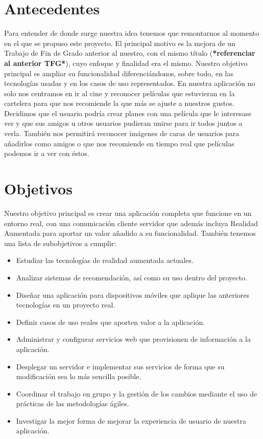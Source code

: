 \section{Antecedentes}
\label{makereference1.1}
\begin{flushleft}
    Para entender de donde surge nuestra idea tenemos que remontarnos al momento en el que se propuso este proyecto.
    El principal motivo es la mejora de un Trabajo de Fin de Grado anterior
    al nuestro, con el mismo título (\textbf{*referenciar al anterior TFG*}), cuyo enfoque y finalidad era el mismo. Nuestro objetivo principal es 
    ampliar su funcionalidad diferenciándonos, sobre todo, en las tecnologías usadas y 
    en los casos de uso representados.
    En nuestra aplicación no solo nos centramos en ir al cine y reconocer películas que estuvieran en la cartelera
    para que nos recomiende la que más se ajuste a nuestros gustos. Decidimos que el usuario podría crear planes con
    una película que le interesase ver y que sus amigos u otros usuarios pudieran unirse para ir todos juntos a verla.
    También nos permitirá reconocer imágenes de caras de usuarios para añadirlos como amigos o que nos recomiende en tiempo real
    que películas podemos ir a ver con éstos.
\end{flushleft}
\section{Objetivos}
\label{makereference1.2}
Nuestro objetivo principal es crear una aplicación completa que funcione en un entorno real, con una comunicación cliente servidor que además 
incluya Realidad Aumentada para aportar un valor añadido a su funcionalidad.
También tenemos una lista de subobjetivos a cumplir:
\begin{itemize}  
    \item Estudiar las tecnologías de realidad aumentada actuales.
    \item Analizar sistemas de recomendación, así como su uso dentro del proyecto.
    \item Diseñar una aplicación para dispositivos móviles que aplique las anteriores tecnologías en un proyecto real.
    \item Definir casos de uso reales que aporten valor a la aplicación.
    \item Administrar y configurar servicios web que provisionen de información a la aplicación.
    \item Desplegar un servidor e implementar sus servicios de forma que su modificación sea lo más sencilla posible.
    \item Coordinar el trabajo en grupo y la gestión de los cambios mediante el uso de prácticas de las metodologías ágiles.
    \item Investigar la mejor forma de mejorar la experiencia de usuario de nuestra aplicación.
\end{itemize}

